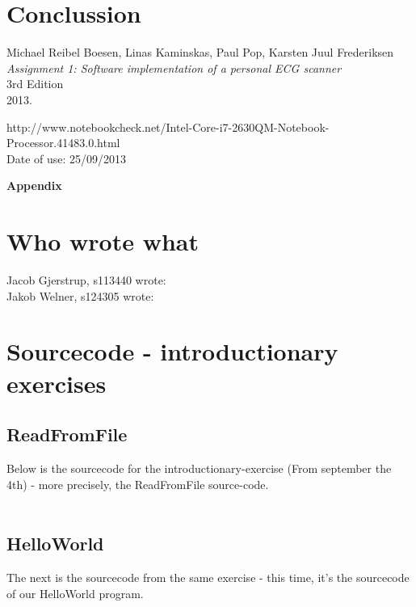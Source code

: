 \documentclass[12pt,a4paper]{article}
\begin{document}
\section{Conclussion}

\newpage
\begin{thebibliography}{9}

  Michael Reibel Boesen, Linas Kaminskas, Paul Pop, Karsten Juul Frederiksen\\
  \emph{Assignment 1: Software implementation of a personal ECG scanner}\\
  3rd Edition\\
  2013.

	http://www.notebookcheck.net/Intel-Core-i7-2630QM-Notebook-Processor.41483.0.html\\
	Date of use: 25/09/2013
\end{thebibliography}
	
\newpage	
	\begin{Large}
		\textbf{Appendix}
	\end{Large}
	\appendix

\section{Who wrote what}
Jacob Gjerstrup, s113440 wrote: \\
Jakob Welner, s124305 wrote: \\
	
\section{Sourcecode - introductionary exercises}
\subsection{ReadFromFile}
	Below is the sourcecode for the introductionary-exercise (From september the 4th) - more precisely, the ReadFromFile source-code.\\
	\\
	

\subsection{HelloWorld}
	The next is the sourcecode from the same exercise - this time, it's the sourcecode of our HelloWorld program.\\
	\\
	
	
\end{document}
